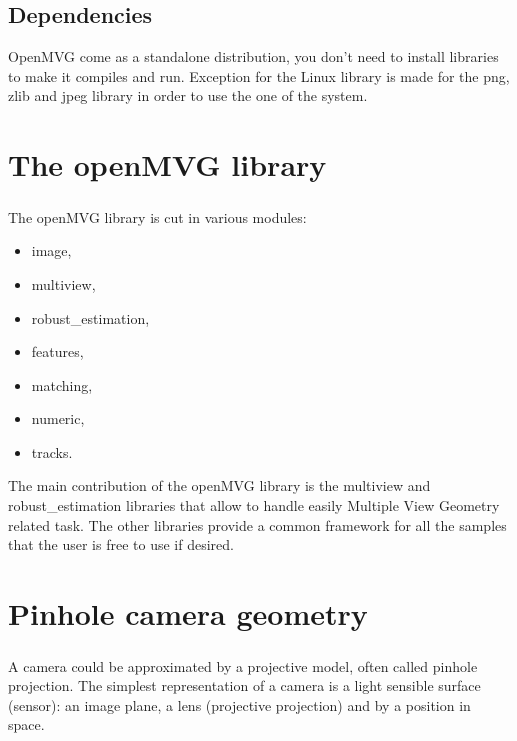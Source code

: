 \documentclass[11pt, letterpaper]{report}
\begin{document}
\section*{Dependencies}

OpenMVG come as a standalone distribution, you don't need to install libraries to make it compiles and run. Exception for the Linux library is made for the png, zlib and jpeg library in order to use the one of the system.

\newpage
\chapter{The openMVG library}
\paragraph{}
The openMVG library is cut in various modules:
\begin{itemize}
\item image,
\item multiview,
\item robust\_estimation,
\item features,
\item matching,
\item numeric,
\item tracks.
\end{itemize}

The main contribution of the openMVG library is the multiview and robust\_estimation libraries that allow to handle easily Multiple View Geometry related task. The other libraries provide a common framework for all the samples that the user is free to use if desired.

\newpage
\chapter{Pinhole camera geometry}
\paragraph{}
A camera could be approximated by a projective model, often called pinhole projection. The simplest representation of a camera is a light sensible surface (sensor): an image plane, a lens (projective projection) and by a position in space.
\end{document}
